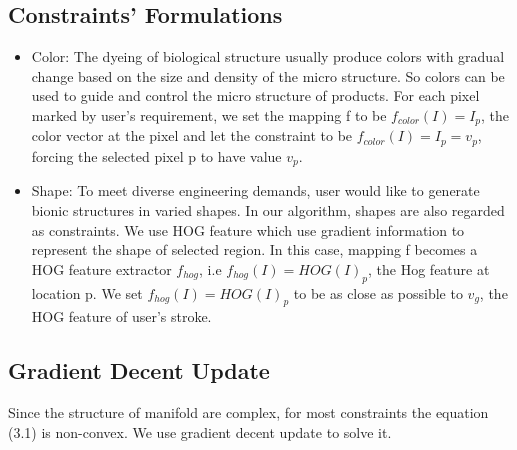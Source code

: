 \subsection{Constraints' Formulations}
\begin{itemize}
\item Color: The dyeing of biological structure usually produce colors with gradual change based on the size and density of the micro structure. So colors can be used to guide and control the micro structure of products. For each pixel marked by user's requirement, we set the mapping f to be $f_{color}(I) = I_p$, the color vector at the pixel and let the constraint to be $f_{color}(I) = I_p=v_p$, forcing the selected pixel p to have value $v_p$.

\item Shape: To meet diverse engineering demands, user would like to generate bionic structures in varied shapes. In our algorithm, shapes are also regarded as constraints. We use HOG feature\cite{dalal2005histograms} which use gradient information to represent the shape of selected region. In this case, mapping f becomes a HOG feature extractor $f_{hog}$, i.e $f_{hog}(I)=HOG(I)_p$, the Hog feature at location p. We set $f_{hog}(I) = HOG(I)_p$ to be as close as possible to $v_g$, the HOG feature of user’s stroke.
\end{itemize}
\subsection{Gradient Decent Update}
Since the structure of manifold are complex, for most constraints the equation (3.1) is non-convex. We use gradient decent update to solve it. 